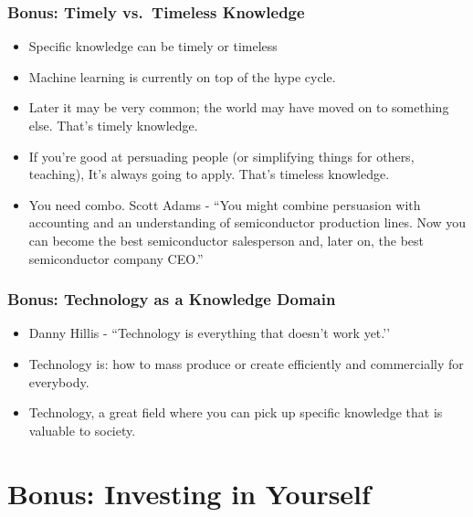 \begin{frame}[fragile]
\frametitle{Bonus: Timely vs.\ Timeless Knowledge}
\begin{itemize}
\item Specific knowledge can be timely or timeless
\item Machine learning is currently on top of the hype cycle. 
\item Later it may be very common; the world may have moved on to something else. That’s timely knowledge.
\item If you’re good at persuading people (or simplifying things for others, teaching), It’s always going to apply. That’s timeless knowledge.
\item You need combo. Scott Adams - ``You might combine persuasion with accounting and an
understanding of semiconductor production lines. Now you can become the best semiconductor salesperson and, later on, the best semiconductor company CEO.''
\end{itemize}
\end{frame}

\begin{frame}[fragile]
\frametitle{Bonus: Technology as a Knowledge Domain}
\begin{itemize}
\item Danny Hillis - ``Technology is everything that doesn’t work yet.’’
\item Technology is: how to mass produce or create efficiently and commercially for everybody.
\item Technology, a great field where you can pick up specific knowledge that is valuable to society.
\end{itemize}
\end{frame}

\section{Bonus: Investing in Yourself}

